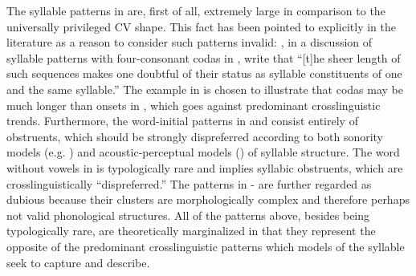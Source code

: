   The syllable patterns in  are, first of all, extremely large in comparison to the universally privileged CV shape. This fact has been pointed to explicitly in the literature as a reason to consider such patterns invalid: \citet[195]{KayeEtAl1990}, in a discussion of syllable patterns with four-consonant codas in , write that “[t]he sheer length of such sequences makes one doubtful of their status as syllable constituents of one and the same syllable.” The example in  is chosen to illustrate that codas may be much longer than onsets in , which goes against predominant crosslinguistic trends. Furthermore, the word-initial patterns in  and  consist entirely of obstruents, which should be strongly dispreferred according to both sonority models (e.g. \citealt{Clements1990}) and acoustic-perceptual models (\citealt{OhalaKawasaki-Fukumori1997}) of syllable structure. The word without vowels in  is typologically rare and implies syllabic obstruents, which are crosslinguistically ``dispreferred.'' The patterns in - are further regarded as dubious because their clusters are morphologically complex and therefore perhaps not valid phonological structures. All of the patterns above, besides being typologically rare, are theoretically marginalized in that they represent the opposite of the predominant crosslinguistic patterns which models of the syllable seek to capture and describe.

